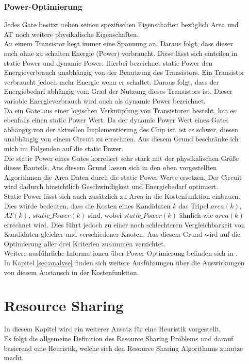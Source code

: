 \documentclass[11pt, a4paper, german]{article}
\begin{document}
\subsubsection{Power-Optimierung}
Jedes Gate besitzt neben seinen spezifischen Eigenschaften bezüglich Area und AT noch weitere physikalische Eigenschaften.\\
An einem Transistor liegt immer eine Spannung an. Daraus folgt, dass dieser auch ohne zu schalten Energie (Power) verbraucht. Diese lässt sich einteilen in static Power und dynamic Power. Hierbei bezeichnet static Power den Energieverbrauch unabhängig von der Benutzung des Transistors. Ein Transistor verbraucht jedoch mehr Energie wenn er schaltet. Daraus folgt, dass der Energiebedarf abhängig vom Grad der Nutzung dieses Transistors ist. Dieser variable Energieverbrauch wird auch als dynamic Power bezeichnet.\\
Da ein Gate aus einer logischen Verknüpfung von Transistoren besteht, hat es ebenfalls einen static Power Wert. Da der dynamic Power Wert eines Gates abhängig von der aktuellen Implementierung des Chip ist, ist es schwer, diesen unabhängig von einem Circuit zu errechnen. Aus diesem Grund beschränke ich mich im Folgenden auf die static Power. \\
Die static Power eines Gates korreliert sehr stark mit der physikalischen Größe dieses Bauteils. Aus diesem Grund lassen sich in den oben vorgestellten Algorithmen die Area Daten durch die static Power Werte ersetzen. Der Circuit wird dadurch hinsichtlich Geschwindigkeit und Energiebedarf optimiert. \\
Static Power lässt sich auch zusätzlich zu Area in die Kostenfunktion einbauen. Dies würde bedeuten, dass die Kosten eines Kandidaten $k$ das Tripel $area(k)$, $AT(k)$, $static\_Power(k)$ sind, wobei $static\_Power(k)$ ähnlich wie $area(k)$ errechnet wird. Dies führt jedoch zu einer noch schlechteren Vergleichbarkeit von Kandidaten gleicher und verschiedener Knoten. Aus diesem Grund wird auf die Optimierung aller drei Kriterien zusammen verzichtet. \\
Weitere ausführliche Informationen über Power-Optimierung befinden sich in \cite{Daboul}.\\
In Kapitel \ref{sec:analyse} finden sich weitere Ausführungen über die Auswirkungen von diesem Austausch in der Kostenfunktion.


\section{Resource Sharing}\label{sec:resource_sh}
In diesem Kapitel wird ein weiterer Ansatz für eine Heuristik vorgestellt.\\
Es folgt die allgemeine Definition des Resource Sharing Problems und darauf basierend eine Heuristik, welche sich den Resource Sharing Algorithmus zunutze macht.
\end{document}
